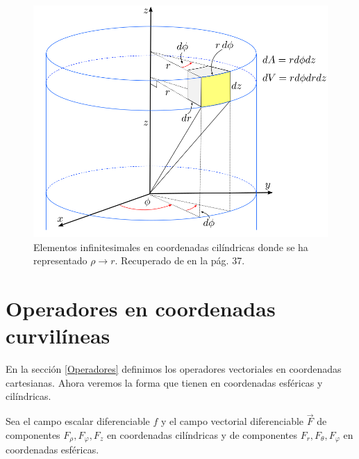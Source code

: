 \begin{figure}[H]
    \centering
    \includegraphics[scale = 0.4]{Figuras/Volumen-Cilindricas.png}
    \caption{Elementos infinitesimales en coordenadas cilíndricas donde se ha representado $\rho \to r$. Recuperado de \cite{Alvarez} en la pág. 37.}
    \label{fig:Vol-Cilindricas}
\end{figure}

\section{Operadores en coordenadas curvilíneas}

En la sección \ref{Operadores} definimos los operadores vectoriales en coordenadas cartesianas. Ahora veremos la forma que tienen en coordenadas esféricas y cilíndricas.

Sea el campo escalar diferenciable $f$ y el campo vectorial diferenciable $\vec{F}$ de componentes $F_{\rho}, F_{\varphi}, F_z$ en coordenadas cilíndricas y de componentes $F_r, F_{\theta}, F_{\varphi}$  en coordenadas esféricas.

